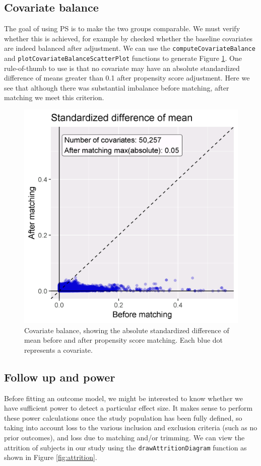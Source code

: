 \documentclass[11pt]{book}
\begin{document}
\subsection{Covariate balance}\label{covariate-balance}

The goal of using PS is to make the two groups comparable. We must
verify whether this is achieved, for example by checked whether the
baseline covariates are indeed balanced after adjustment. We can use the
\texttt{computeCovariateBalance} and
\texttt{plotCovariateBalanceScatterPlot} functions to generate Figure
\ref{fig:balance}. One rule-of-thumb to use is that no covariate may
have an absolute standardized difference of means greater than 0.1 after
propensity score adjustment. Here we see that although there was
substantial imbalance before matching, after matching we meet this
criterion.

\begin{figure}

{\centering \includegraphics[width=0.7\linewidth]{images/PopulationLevelEstimation/balance} 

}

\caption{Covariate balance, showing the absolute standardized difference of mean before and after propensity score matching. Each blue dot represents a covariate.}\label{fig:balance}
\end{figure}

\subsection{Follow up and power}\label{follow-up-and-power}

Before fitting an outcome model, we might be interested to know whether
we have sufficient power to detect a particular effect size. It makes
sense to perform these power calculations once the study population has
been fully defined, so taking into account loss to the various inclusion
and exclusion criteria (such as no prior outcomes), and loss due to
matching and/or trimming. We can view the attrition of subjects in our
study using the \texttt{drawAttritionDiagram} function as shown in
Figure \ref{fig:attrition}.
\end{document}
